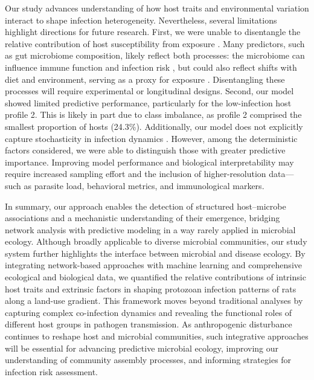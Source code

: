 \documentclass[oneside, a4paper, onecolumn, 11pt]{article}
\begin{document}
Our study advances understanding of how host traits and environmental variation interact to shape infection heterogeneity. Nevertheless, several limitations highlight directions for future research. First, we were unable to disentangle the relative contribution of host susceptibility from exposure \citep{Sweeny2022-dm}. Many predictors, such as gut microbiome composition, likely reflect both processes: the microbiome can influence immune function and infection risk \citep{Rosshart2017-pu,Leung2018-qm}, but could also reflect shifts with diet and environment, serving as a proxy for exposure \citep{Markfeld2025-ny,Fackelmann2021-zf}. Disentangling these processes will require experimental or longitudinal designs. Second, our model showed limited predictive performance, particularly for the low-infection host profile 2. This is likely in part due to class imbalance, as profile 2 comprised the smallest proportion of hosts (24.3\%). Additionally, our model does not explicitly capture stochasticity in infection dynamics \citep{May2023-te}. However, among the deterministic factors considered, we were able to distinguish those with greater predictive importance. Improving model performance and biological interpretability may require increased sampling effort and the inclusion of higher-resolution data---such as parasite load, behavioral metrics, and immunological markers.

In summary, our approach enables the detection of structured host–microbe associations and a mechanistic understanding of their emergence, bridging network analysis with predictive modeling in a way rarely applied in microbial ecology. Although broadly applicable to diverse microbial communities, our study system further highlights the interface between microbial and disease ecology. By integrating network-based approaches with machine learning and comprehensive ecological and biological data, we quantified the relative contributions of intrinsic host traits and extrinsic factors in shaping protozoan infection patterns of rats along a land-use gradient. This framework moves beyond traditional analyses by capturing complex co-infection dynamics and revealing the functional roles of different host groups in pathogen transmission. As anthropogenic disturbance continues to reshape host and microbial communities, such integrative approaches will be essential for advancing predictive microbial ecology, improving our understanding of community assembly processes, and informing strategies for infection risk assessment.

\vspace{6 mm}
\end{document}
